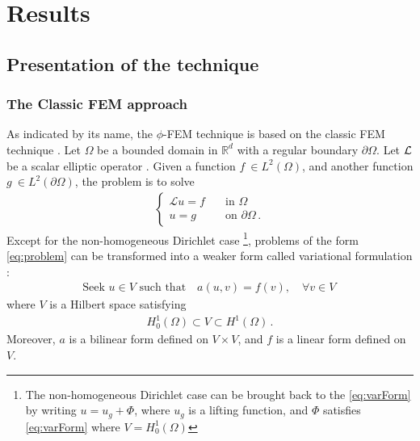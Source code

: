 

\chapter{Results} %

\label{Chapter3} %



\section{Presentation of the \phifem technique}

\subsection{The Classic FEM approach}
As indicated by its name, the $\phi$-FEM technique is based on the classic FEM technique \parencite[p.111]{ern2013theory}. Let $\Omega$ be a bounded domain in $\mathbb{R}^d$ with a regular boundary $\partial\Omega$. Let $\cal{L}$ be a scalar elliptic operator \parencite{evans}. Given a function $f\ \in L^2(\Omega)$, and another function $g\ \in L^2(\partial \Omega)$, the problem is to solve
\begin{align}
    \begin{cases}
        \mathcal{L} u = f  \quad &\text{in } \Omega \\
        u = g & \text{on } \partial\Omega \,.
    \end{cases}
    \label{eq:problem}
\end{align}
Except for the non-homogeneous Dirichlet case \footnote{The non-homogeneous Dirichlet case can be brought back to the \ref{eq:varForm} by writing $u=u_g + \Phi$, where $u_g$ is a lifting function, and $\Phi$ satisfies \ref{eq:varForm} where $V=H^1_0(\Omega)$}, problems of the form \eqref{eq:problem} can be transformed into a weaker form called variational formulation :
\begin{align}
    \text{Seek } u \in V \text{ such that} \quad a(u,v)=f(v), \quad \forall v \in V \,
    \label{eq:varForm}
\end{align}
where $V$ is a Hilbert space satisfying
\begin{align*}
    H_0^1 (\Omega) \subset V \subset H^1 (\Omega) \,.
\end{align*}
Moreover, $a$ is a bilinear form defined on $V\times V$, and $f$ is a linear form defined on $V$.

